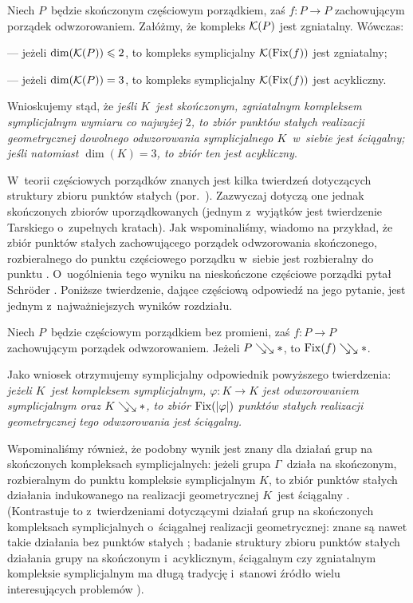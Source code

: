 \begin{stw*}[\ref{stw-baclawski_dla_wymiarow_2_i_3}]
Niech $P$~będzie skończonym częściowym porządkiem, zaś $f\colon P\to P$ zachowującym porządek odwzorowaniem. Załóżmy, że kompleks $\mathcal{K}(P)$ jest zgniatalny. Wówczas:
\begin{compactitem}
\item[---] jeżeli $\dim(\mathcal{K}(P))\leqslant 2$, to kompleks symplicjalny $\mathcal{K}(\operatorname{Fix}(f))$ jest zgniatalny;
\item[---] jeżeli $\dim(\mathcal{K}(P))=3$, to kompleks symplicjalny $\mathcal{K}(\operatorname{Fix}(f))$ jest acykliczny.
\end{compactitem}
\end{stw*}

Wnioskujemy stąd, że \textit{jeśli $K$~jest skończonym, zgniatalnym kompleksem symplicjalnym wymiaru co najwyżej $2$, to zbiór punktów stałych realizacji geometrycznej dowolnego odwzorowania symplicjalnego $K$~w~siebie jest ściągalny; jeśli natomiast $\dim(K)=3$, to zbiór ten jest acykliczny}.

W~teorii częściowych porządków znanych jest kilka twierdzeń dotyczących struktury zbioru punktów stałych (por.~\cite{Baclawski79,Duffus80a,Schroder99}). Zazwyczaj dotyczą one jednak skończonych zbiorów uporządkowanych (jednym z~wyjątków jest twierdzenie Tarskiego \cite{Tarski55} o~zupełnych kratach). Jak wspominaliśmy, wiadomo na przykład, że zbiór punktów stałych zachowującego porządek odwzorowania skończonego, rozbieralnego do punktu częściowego porządku w~siebie jest rozbieralny do punktu \cite{Duffus80a}. O~uogólnienia tego wyniku na nieskończone częściowe porządki pytał Schr{\"o}der \cite[s. 136]{Schroder03}. Poniższe twierdzenie, dające częściową odpowiedź na jego pytanie, jest jednym z~najważniejszych wyników rozdziału.

\begin{tw*}[\ref{tw-fixed_point_set_of_a_map_is_dismantlable}]
Niech $P$~będzie częściowym porządkiem bez promieni, zaś \mbox{$f\colon P\to P$} zachowującym porządek odwzorowaniem. Jeżeli $P\searrow\!\!\searrow *$, to $\operatorname{Fix}(f)\searrow\!\!\searrow *$.
\end{tw*}

Jako wniosek otrzymujemy symplicjalny odpowiednik powyższego twierdzenia: \textit{jeżeli $K$~jest kompleksem symplicjalnym, $\varphi\colon K\to K$ jest odwzorowaniem symplicjalnym oraz $K\searrow\!\!\searrow *$, to zbiór $\operatorname{Fix}(|\varphi|)$ punktów stałych realizacji geometrycznej tego odwzorowania jest ściągalny.}

Wspominaliśmy również, że podobny wynik jest znany dla działań grup na skończonych kompleksach symplicjalnych: jeżeli grupa $\Gamma$~działa na skończonym, rozbieralnym do punktu kompleksie symplicjalnym $K$, to zbiór punktów stałych działania indukowanego na realizacji geometrycznej $K$~jest ściągalny \cite{Barmak12,Hensel14}. (Kontrastuje to z~twierdzeniami dotyczącymi działań grup na skończonych kompleksach symplicjalnych o~ściągalnej realizacji geometrycznej: znane są nawet takie działania bez punktów stałych \cite{Floyd59}; badanie struktury zbioru punktów stałych działania grupy na skończonym i~acyklicznym, ściągalnym czy zgniatalnym kompleksie symplicjalnym ma długą tradycję i~stanowi źródło wielu interesujących problemów \cite{Smith42,Oliver75,Segev93,Segev94}).

